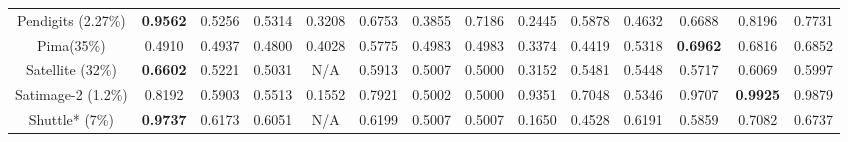\documentclass[sigconf,nonacm]{acmart}
\begin{document}
\begin{table*}[h!]
{\begin{tabular}{|p{5cm}||p{5cm}|p{5cm}|p{5cm}|p{5cm}|p{5cm}|p{5cm}|p{5cm}|p{5cm}|p{5cm}|p{5cm}|p{5cm}|p{5cm}|p{5cm}}
    \multicolumn{1}{c||}{Pendigits (2.27\%)} & \multicolumn{1}{c|}{\textbf{0.9562}} & \multicolumn{1}{c}{0.5256} & \multicolumn{1}{c}{0.5314} &   \multicolumn{1}{c}{0.3208} & \multicolumn{1}{c|}{0.6753} & \multicolumn{1}{c}{0.3855} & \multicolumn{1}{c||}{0.7186} & \multicolumn{1}{c}{0.2445} & \multicolumn{1}{c}{0.5878} & \multicolumn{1}{c}{0.4632} & \multicolumn{1}{c}{0.6688} & \multicolumn{1}{c}{0.8196} & \multicolumn{1}{c}{0.7731}\\
    
    \multicolumn{1}{c||}{Pima(35\%)} & \multicolumn{1}{c|}{0.4910} & \multicolumn{1}{c}{0.4937} & \multicolumn{1}{c}{0.4800} &   \multicolumn{1}{c}{0.4028} & \multicolumn{1}{c|}{0.5775} & \multicolumn{1}{c}{0.4983} & \multicolumn{1}{c||}{0.4983} & \multicolumn{1}{c}{0.3374} & \multicolumn{1}{c}{0.4419} & \multicolumn{1}{c}{0.5318} & \multicolumn{1}{c}{\textbf{0.6962}} & \multicolumn{1}{c}{0.6816} & \multicolumn{1}{c}{0.6852}\\
    
    \multicolumn{1}{c||}{Satellite (32\%)} & \multicolumn{1}{c|}{\textbf{0.6602}} & \multicolumn{1}{c}{0.5221} & \multicolumn{1}{c}{0.5031} &   \multicolumn{1}{c}{N/A} & \multicolumn{1}{c|}{0.5913} & \multicolumn{1}{c}{0.5007} & \multicolumn{1}{c||}{0.5000} & \multicolumn{1}{c}{0.3152} & \multicolumn{1}{c}{0.5481} & \multicolumn{1}{c}{0.5448} & \multicolumn{1}{c}{0.5717} & \multicolumn{1}{c}{0.6069} & \multicolumn{1}{c}{0.5997}\\
    
    \multicolumn{1}{c||}{Satimage-2 (1.2\%)} & \multicolumn{1}{c|}{0.8192} & \multicolumn{1}{c}{0.5903} & \multicolumn{1}{c}{0.5513} &   \multicolumn{1}{c}{0.1552} & \multicolumn{1}{c|}{0.7921} & \multicolumn{1}{c}{0.5002} & \multicolumn{1}{c||}{0.5000} & \multicolumn{1}{c}{0.9351} & \multicolumn{1}{c}{0.7048} & \multicolumn{1}{c}{0.5346} & \multicolumn{1}{c}{0.9707} & \multicolumn{1}{c}{\textbf{0.9925}} & \multicolumn{1}{c}{0.9879}\\
    
    \multicolumn{1}{c||}{Shuttle* (7\%)} & \multicolumn{1}{c|}{\textbf{0.9737}} & \multicolumn{1}{c}{0.6173} & \multicolumn{1}{c}{0.6051} &   \multicolumn{1}{c}{N/A} & \multicolumn{1}{c|}{0.6199} & \multicolumn{1}{c}{0.5007} & \multicolumn{1}{c||}{0.5007} & \multicolumn{1}{c}{0.1650} & \multicolumn{1}{c}{0.4528} & \multicolumn{1}{c}{0.6191} & \multicolumn{1}{c}{0.5859} & \multicolumn{1}{c}{0.7082} & \multicolumn{1}{c}{0.6737}\\
    

\end{tabular}}
\end{table*}
\end{document}
